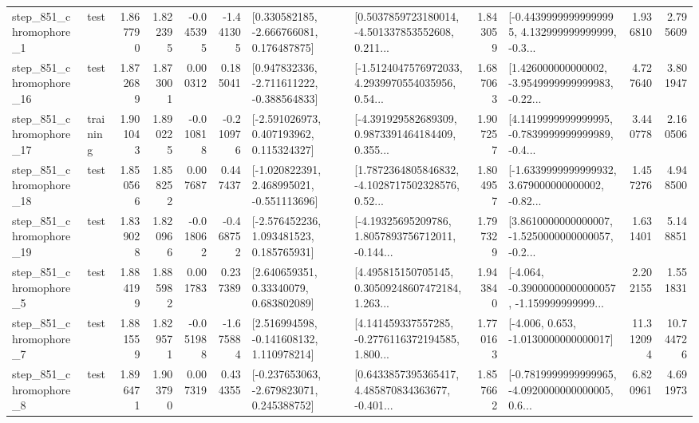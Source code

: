 \begin{tabular}{llrrrrllrlrr}
   step\_851\_chromophore\_1 &      test &      1.867790 &    1.822395 &     -0.045395 & -1.441305 &    [0.330582185, -2.666766081, 0.176487875] &  [0.5037859723180014, -4.501337853552608, 0.211... &       1.843059 &  [-0.44399999999999995, 4.132999999999999, -0.3... &            1.936810 &          2.795609 \\
  step\_851\_chromophore\_16 &      test &      1.872689 &    1.873001 &      0.000312 &  0.185041 &   [0.947832336, -2.711611222, -0.388564833] &  [-1.5124047576972033, 4.2939970554035956, 0.54... &       1.687063 &  [1.426000000000002, -3.9549999999999983, -0.22... &            4.727640 &          3.801947 \\
  step\_851\_chromophore\_17 &  training &      1.901043 &    1.890225 &     -0.010818 & -0.210976 &    [-2.591026973, 0.407193962, 0.115324327] &  [-4.391929582689309, 0.9873391464184409, 0.355... &       1.907257 &  [4.1419999999999995, -0.7839999999999989, -0.4... &            3.440778 &          2.160506 \\
  step\_851\_chromophore\_18 &      test &      1.850566 &    1.858252 &      0.007687 &  0.447437 &   [-1.020822391, 2.468995021, -0.551113696] &  [1.7872364805846832, -4.1028717502328576, 0.52... &       1.804957 &  [-1.6339999999999932, 3.679000000000002, -0.82... &            1.457276 &          4.948500 \\
  step\_851\_chromophore\_19 &      test &      1.839028 &    1.820966 &     -0.018062 & -0.468752 &    [-2.576452236, 1.093481523, 0.185765931] &  [-4.19325695209786, 1.8057893756712011, -0.144... &       1.797329 &  [3.8610000000000007, -1.5250000000000057, -0.2... &            1.631401 &          5.148851 \\
   step\_851\_chromophore\_5 &      test &      1.884199 &    1.885982 &      0.001783 &  0.237389 &      [2.640659351, 0.33340079, 0.683802089] &  [4.495815150705145, 0.30509248607472184, 1.263... &       1.943840 &  [-4.064, -0.39000000000000057, -1.159999999999... &            2.202155 &          1.551831 \\
   step\_851\_chromophore\_7 &      test &      1.881559 &    1.829571 &     -0.051988 & -1.675884 &    [2.516994598, -0.141608132, 1.110978214] &  [4.141459337557285, -0.2776116372194585, 1.800... &       1.770163 &               [-4.006, 0.653, -1.0130000000000017] &           11.312094 &         10.744726 \\
   step\_851\_chromophore\_8 &      test &      1.896471 &    1.903790 &      0.007319 &  0.434355 &   [-0.237653063, -2.679823071, 0.245388752] &  [0.6433857395365417, 4.485870834363677, -0.401... &       1.857662 &  [-0.7819999999999965, -4.0920000000000005, 0.6... &            6.820961 &          4.691973 \\

\end{tabular}

